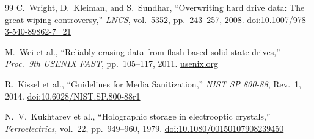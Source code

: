 \documentclass[11pt,a4paper,openany]{book}
\theoremstyle{definition}
\theoremstyle{plain}
\theoremstyle{remark}
\begin{document}
\begin{thebibliography}{99}
C.~Wright, D.~Kleiman, and S.~Sundhar, ``Overwriting hard drive data:
The great wiping controversy,''
\textit{LNCS}, vol.\ 5352, pp.\ 243--257, 2008.
\href{https://doi.org/10.1007/978-3-540-89862-7_21}{doi:10.1007/978-3-540-89862-7\_21}

M.~Wei et al., ``Reliably erasing data from flash-based solid state
drives,''
\textit{Proc.\ 9th USENIX FAST}, pp.\ 105--117, 2011.
\href{https://www.usenix.org/conference/fast11/reliably-erasing-data-flash-based-solid-state-drives}{usenix.org}

R.~Kissel et al., ``Guidelines for Media Sanitization,''
\textit{NIST SP 800-88}, Rev.\ 1, 2014.
\href{https://doi.org/10.6028/NIST.SP.800-88r1}{doi:10.6028/NIST.SP.800-88r1}


N.~V.~Kukhtarev et al., ``Holographic storage in electrooptic
crystals,''
\textit{Ferroelectrics}, vol.\ 22, pp.\ 949--960, 1979.
\href{https://doi.org/10.1080/00150107908239450}{doi:10.1080/00150107908239450}

\end{thebibliography}
\end{document}
